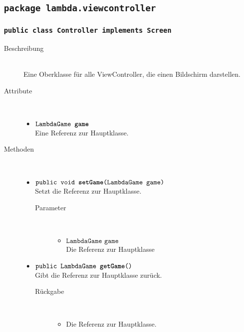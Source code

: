 \subsection{\texttt{package lambda.viewcontroller}}

\subsubsection{\normalfont \texttt{public class \textbf{Controller} implements Screen}}

\begin{description}
\item[Beschreibung] \hfill \\ Eine Oberklasse für alle ViewController, die einen Bildschirm darstellen.

\item[Attribute] \hfill \\
	\vspace{-.8cm}
	\begin{itemize}
		\item $\texttt{LambdaGame \textbf{game}}$ \\ Eine Referenz zur Hauptklasse.
	\end{itemize}
	
\item[Methoden] \hfill \\
	\vspace{-.8cm}
	\begin{itemize}
		\item $\texttt{public void \textbf{setGame}(LambdaGame game)}$ \\ Setzt die Referenz zur Hauptklasse.
		\begin{description}
			\item[Parameter] \hfill \\
			\vspace{-.8cm}
			\begin{itemize}
				\item $\texttt{LambdaGame game}$ \\ Die Referenz zur Hauptklasse
			\end{itemize}
		\end{description}
		
		\item $\texttt{public LambdaGame \textbf{getGame}()}$ \\ Gibt die Referenz zur Hauptklasse zurück.
		\begin{description}
			\item[Rückgabe] \hfill \\
			\vspace{-.8cm}
			\begin{itemize}
				\item Die Referenz zur Hauptklasse.
			\end{itemize}
		\end{description}
				

\end{itemize}
\end{description}
